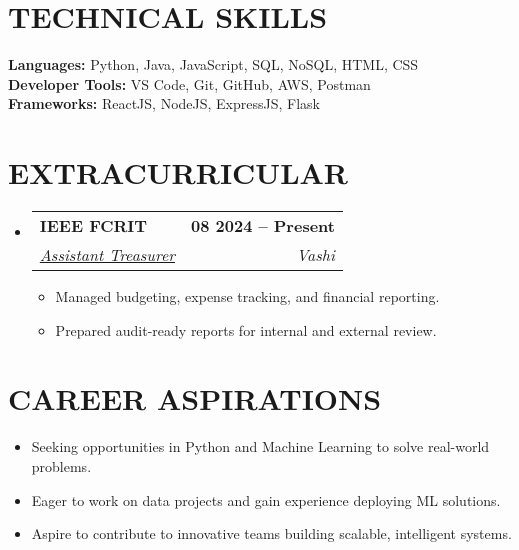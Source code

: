 \documentclass[letterpaper,11pt]{article}
\makeatletter
\newcommand{\resumeItem}[1]{
  \item\small{{#1 \vspace{-2pt}}}
}
\newcommand{\resumeSubheading}[4]{
  \vspace{-2pt}\item
    \begin{tabular*}{\linewidth}[t]{@{\extracolsep{\fill}}p{0.7\textwidth}r}
      \textbf{\large#1} & \textbf{\small #2} \\
      \textit{\large#3} & \textit{\small #4} \\
    \end{tabular*}\vspace{-7pt}
}
\newcommand{\resumeItemListStart}{\begin{itemize}}
\newcommand{\resumeItemListEnd}{\end{itemize}\vspace{-5pt}}
\newcommand{\resumeSubHeadingListStart}{\begin{itemize}[leftmargin=0.0in, label={}]}
\newcommand{\resumeSubHeadingListEnd}{\end{itemize}}
\makeatother
\begin{document}
\section{TECHNICAL SKILLS}
\begin{itemize}[leftmargin=0.15in, label={}]
\small{\item{
    \textbf{Languages:} Python, Java, JavaScript, SQL, NoSQL, HTML, CSS \\
    \textbf{Developer Tools:} VS Code, Git, GitHub, AWS, Postman \\
    \textbf{Frameworks:} ReactJS, NodeJS, ExpressJS, Flask
}}
\end{itemize}

\section{EXTRACURRICULAR}
\resumeSubHeadingListStart
    \resumeSubheading
      {IEEE FCRIT}{08 2024 -- Present}
      {\underline{Assistant Treasurer}}{Vashi}
        \resumeItemListStart
            \resumeItem{Managed budgeting, expense tracking, and financial reporting.}
            \resumeItem{Prepared audit-ready reports for internal and external review.}
        \resumeItemListEnd
\resumeSubHeadingListEnd

\section{CAREER ASPIRATIONS}
\resumeItemListStart
    \resumeItem{Seeking opportunities in Python and Machine Learning to solve real-world problems.}
    \resumeItem{Eager to work on data projects and gain experience deploying ML solutions.}
    \resumeItem{Aspire to contribute to innovative teams building scalable, intelligent systems.}
\resumeItemListEnd
\end{document}
